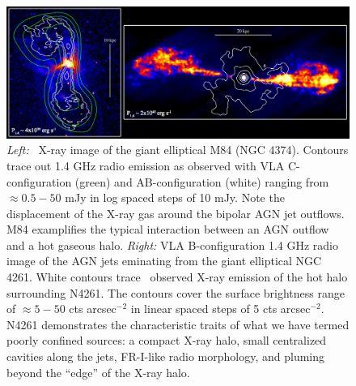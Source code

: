 \documentclass[12pt, preprint]{aastex}
\begin{document}
\begin{figure}[htp]
  \begin{center}
    \begin{minipage}[htp]{\linewidth}
      \includegraphics*[width=\textwidth, trim=0mm 0mm 0mm 0mm, clip]{f3.eps}
      \caption{{\it{Left:}} \chandra\ X-ray image of the giant
        elliptical M84 (NGC 4374). Contours trace out 1.4 GHz radio
        emission as observed with VLA C-configuration (green) and
        AB-configuration (white) ranging from $\approx 0.5-50$ mJy in
        log spaced steps of 10 mJy. Note the displacement of the X-ray
        gas around the bipolar AGN jet outflows. M84 examplifies the
        typical interaction between an AGN outflow and a hot gaseous
        halo. {\it{Right:}} VLA B-configuration 1.4 GHz radio image of
        the AGN jets eminating from the giant elliptical NGC
        4261. White contours trace \chandra\ observed X-ray emission
        of the hot halo surrounding N4261. The contours cover the
        surface brightness range of $\approx 5-50$ cts arcsec$^{-2}$
        in linear spaced steps of 5 cts arcsec$^{-2}$. N4261
        demonstrates the characteristic traits of what we have termed
        poorly confined sources: a compact X-ray halo, small
        centralized cavities along the jets, FR-I-like radio
        morphology, and pluming beyond the ``edge'' of the X-ray
        halo.}
      \label{fig:pics}
    \end{minipage}
  \end{center}
\end{figure}

\end{document}
